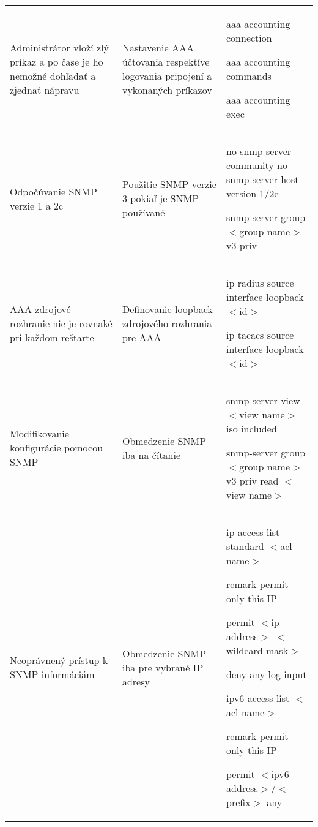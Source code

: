 \begin{longtable}[!htbp]{|L{10em}L{10em}>{\selectfont}L{34em}|}
	
	
	
	 Administrátor vloží zlý príkaz a po čase je ho nemožné dohľadať a zjednať nápravu	&Nastavenie AAA účtovania respektíve logovania pripojení a vykonaných príkazov	&aaa accounting connection
	
	aaa accounting commands
	
	aaa accounting exec\\
	
	
	
	
	Odpočúvanie SNMP verzie 1 a 2c	&Použitie SNMP verzie 3 pokiaľ je SNMP používané	&no snmp-server community
	no snmp-server host  version 1/2c
	
	snmp-server group $<$group name$>$ v3 priv \\
	
	
	
	
	 AAA zdrojové rozhranie nie je rovnaké pri každom reštarte	&Definovanie loopback zdrojového rozhrania pre AAA	&ip radius source interface loopback $<$id$>$
	
	ip tacacs source interface loopback $<$id$>$\\
	
	
	
	
	Modifikovanie konfigurácie pomocou SNMP	&Obmedzenie SNMP iba na čítanie	&snmp-server view $<$view name$>$ iso included
	
	snmp-server group $<$group name$>$ v3 priv read $<$view name$>$\\
	
	
	
	
	 Neoprávnený prístup k SNMP informáciám	&Obmedzenie SNMP iba pre vybrané IP adresy	&ip access-list standard $<$acl name$>$
	
	\hspace{0.5em}remark permit only this IP 
	
	\hspace{0.5em}permit $<$ip address$>$ $<$wildcard mask$>$
	
	\hspace{0.5em}deny any log-input
	\vspace{0.5em}
	
	ipv6 access-list $<$acl name$>$
	
	\hspace{0.5em}remark permit only this IP 
	
	\hspace{0.5em}permit $<$ipv6 address$>$/$<$prefix$>$ any
	

\end{longtable}
